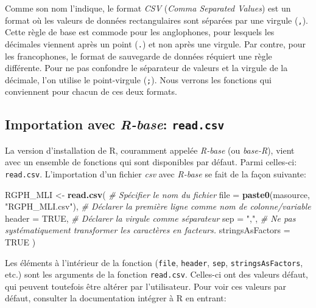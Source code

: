 \documentclass[]{book}
\newenvironment{Shaded}{\begin{snugshade}}{\end{snugshade}}
\newcommand{\KeywordTok}[1]{\textcolor[rgb]{0.13,0.29,0.53}{\textbf{#1}}}
\newcommand{\DataTypeTok}[1]{\textcolor[rgb]{0.13,0.29,0.53}{#1}}
\newcommand{\StringTok}[1]{\textcolor[rgb]{0.31,0.60,0.02}{#1}}
\newcommand{\CommentTok}[1]{\textcolor[rgb]{0.56,0.35,0.01}{\textit{#1}}}
\newcommand{\OtherTok}[1]{\textcolor[rgb]{0.56,0.35,0.01}{#1}}
\newcommand{\NormalTok}[1]{#1}
\begin{document}
Comme son nom l'indique, le format \emph{CSV} (\emph{Comma Separated
Values}) est un format où les valeurs de données rectangulaires sont
séparées par une virgule (\texttt{,}). Cette règle de base est commode
pour les anglophones, pour lesquels les décimales viennent après un
point (\texttt{.}) et non après une virgule. Par contre, pour les
francophones, le format de sauvegarde de données réquiert une règle
différente. Pour ne pas confondre le séparateur de valeurs et la virgule
de la décimale, l'on utilise le point-virgule (\texttt{;}). Nous verrons
les fonctions qui conviennent pour chacun de ces deux formats.

\subsection{\texorpdfstring{Importation avec \emph{R-base}:
\texttt{read.csv}}{Importation avec R-base: read.csv}}\label{importation-avec-r-base-read.csv}

La version d'installation de R, couramment appelée \emph{R-base} (ou
\emph{base-R}), vient avec un ensemble de fonctions qui sont disponibles
par défaut. Parmi celles-ci: \texttt{read.csv}. L'importation d'un
fichier \emph{csv} avec \emph{R-base} se fait de la façon suivante:

\begin{Shaded}
\begin{Highlighting}[]
\NormalTok{RGPH_MLI <-}\StringTok{ }\KeywordTok{read.csv}\NormalTok{(}
  \CommentTok{# Spécifier le nom du fichier}
  \DataTypeTok{file =} \KeywordTok{paste0}\NormalTok{(masource, }\StringTok{"RGPH_MLI.csv"}\NormalTok{), }
  \CommentTok{# Déclarer la première ligne comme nom de colonne/variable}
  \DataTypeTok{header =} \OtherTok{TRUE}\NormalTok{, }
  \CommentTok{# Déclarer la virgule comme séparateur}
  \DataTypeTok{sep =} \StringTok{","}\NormalTok{, }
  \CommentTok{# Ne pas systématiquement transformer les caractères en facteurs.}
  \DataTypeTok{stringsAsFactors =} \OtherTok{TRUE} 
\NormalTok{)}
\end{Highlighting}
\end{Shaded}

Les éléments à l'intérieur de la fonction (\texttt{file},
\texttt{header}, \texttt{sep}, \texttt{stringsAsFactors}, etc.) sont les
arguments de la fonction \texttt{read.csv}. Celles-ci ont des valeurs
défaut, qui peuvent toutefois être altérer par l'utilisateur. Pour voir
ces valeurs par défaut, consulter la documentation intégrer à R en
entrant:
\end{document}
